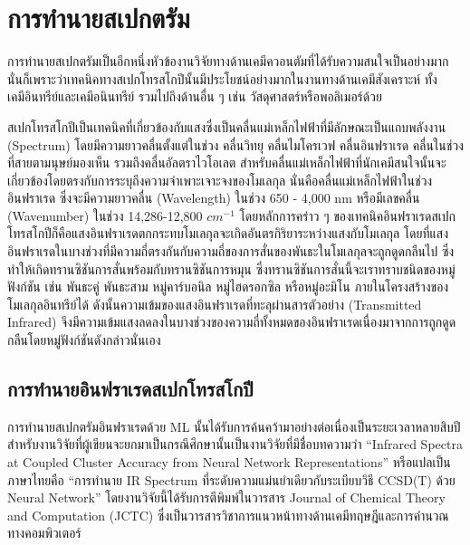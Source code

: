 \section{การทำนายสเปกตรัม}
\label{sec:pred_spectra}

การทำนายสเปกตรัมเป็นอีกหนึ่งหัวข้องานวิจัยทางด้านเคมีควอนตัมที่ได้รับความสนใจเป็นอย่างมากนั่นก็เพราะว่าเทคนิคทางสเปกโทรสโกปีนั้นมีประโยชน์อย่างมากในงานทางด้านเคมีสังเคราะห์ ทั้งเคมีอินทรีย์และเคมีอนินทรีย์ รวมไปถึงด้านอื่น ๆ เช่น วัสดุศาสตร์หรือพอลิเมอร์ด้วย

สเปกโทรสโกปีเป็นเทคนิคที่เกี่ยวข้องกับแสงซึ่งเป็นคลื่นแม่เหล็กไฟฟ้าที่มีลักษณะเป็นแถบพลังงาน (Spectrum) โดยมีความยาวคลื่นตั้งแต่ในช่วง คลื่นวิทยุ คลื่นไมโครเวฟ คลื่นอินฟราเรด คลื่นในช่วงที่สายตามนุษย์มองเห็น รวมถึงคลื่นอัลตราไวโอเลต สำหรับคลื่นแม่เหล็กไฟฟ้าที่นักเคมีสนใจนั้นจะเกี่ยวข้องโดยตรงกับการระบุถึงความจำเพาะเจาะจงของโมเลกุล นั่นคือคลื่นแม่เหล็กไฟฟ้าในช่วงอินฟราเรด ซึ่งจะมีความยาวคลื่น (Wavelength) ในช่วง 650 - 4,000 nm หรือมีเลขคลื่น (Wavenumber) ในช่วง 14,286-12,800 $cm^{-1}$ โดยหลักการคร่าว ๆ ของเทคนิคอินฟราเรดสเปกโทรสโกปีก็คือแสงอินฟราเรดตกกระทบโมเลกุลจะเกิดอันตรกิริยาระหว่างแสงกับโมเลกุล โดยที่แสงอินฟราเรดในบางช่วงที่มีความถี่ตรงกันกับความถี่ของการสั่นของพันธะในโมเลกุลจะถูกดูดกลืนไป ซึ่งทำให้เกิดทรานซิชันการสั่นพร้อมกับทรานซิชันการหมุน ซึ่งทรานซิชันการสั่นนี้จะเราทราบชนิดของหมู่ฟังก์ชัน เช่น พันธะคู่ พันธะสาม หมู่คาร์บอนิล หมู่ไฮดรอกซิล หรือหมู่อะมิโน ภายในโครงสร้างของโมเลกุลอินทรีย์ได้ ดังนั้นความเข้มของแสงอินฟราเรดที่ทะลุผ่านสารตัวอย่าง (Transmitted Infrared) จึงมีความเข้มแสงลดลงในบางช่วงของความถี่ทั้งหมดของอินฟราเรดเนื่องมาจากการถูกดูดกลืนโดยหมู่ฟังก์ชันดังกล่าวนั่นเอง

\subsection{การทำนายอินฟราเรดสเปกโทรสโกปี}
\label{ssec:pred_spec_ir}

การทำนายสเปกตรัมอินฟราเรดด้วย ML นั้นได้รับการค้นคว้ามาอย่างต่อเนื่องเป็นระยะเวลาหลายสิบปี\autocite{gastegger2017} สำหรับงานวิจัยที่ผู้เขียนจะยกมาเป็นกรณีศึกษานั้นเป็นงานวิจัยที่มีชื่อบทความว่า \enquote{Infrared Spectra at Coupled Cluster Accuracy from Neural Network Representations} หรือแปลเป็นภาษาไทยคือ \enquote{การทำนาย IR Spectrum ที่ระดับความแม่นยำเดียวกับระเบียบวิธี CCSD(T) ด้วย Neural Network}\autocite{beckmann2022} โดยงานวิจัยนี้ได้รับการตีพิมพ์ในวารสาร Journal of Chemical Theory and Computation (JCTC) ซึ่งเป็นวารสารวิชาการแนวหน้าทางด้านเคมีทฤษฎีและการคำนวณทางคอมพิวเตอร์

